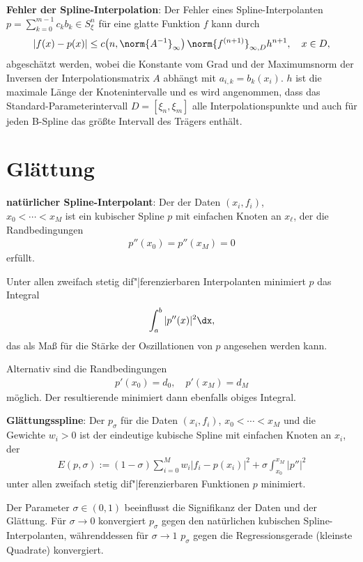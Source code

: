 \linie

\textbf{Fehler der Spline-Interpolation}:
Der Fehler eines Spline-Interpolanten $p = \sum_{k=0}^{m-1} c_k b_k \in S_\xi^n$ für eine glatte
Funktion $f$ kann durch
\begin{align*}
    |f(x) - p(x)| \le c\!\left(n, \norm{A^{-1}}_\infty\right)
    \norm{f^{(n+1)}}_{\infty,D} h^{n+1},\quad
    x \in D,
\end{align*}
abgeschätzt werden, wobei die Konstante vom Grad und der Maximumsnorm der Inversen der
Interpolationsmatrix $A$ abhängt mit $a_{i,k} = b_k(x_i)$.
$h$ ist die maximale Länge der Knotenintervalle und es wird angenommen, dass das
Standard-Parameterintervall $D = [\xi_n, \xi_m]$ alle Interpolationspunkte und auch für jeden
B-Spline das größte Intervall des Trägers enthält.

\pagebreak

\section{%
    Glättung%
}

\textbf{natürlicher Spline-Interpolant}:
Der  der Daten $(x_i, f_i)$,\\
$x_0 < \dotsb < x_M$ ist ein kubischer Spline $p$ mit einfachen Knoten an $x_\ell$,
der die Randbedingungen
\begin{align*}
    p''(x_0) = p''(x_M) = 0
\end{align*}
erfüllt.

Unter allen zweifach stetig dif"|ferenzierbaren Interpolanten minimiert $p$ das Integral
\begin{align*}
    \int_a^b |p''(x)|^2 \dx,
\end{align*}
das als Maß für die Stärke der Oszillationen von $p$ angesehen werden kann.

Alternativ sind die Randbedingungen
\begin{align*}
    p'(x_0) = d_0,\quad
    p'(x_M) = d_M
\end{align*}
möglich.
Der resultierende  minimiert dann ebenfalls obiges
Integral.

\linie

\textbf{Glättungsspline}:
Der  $p_\sigma$ für die Daten $(x_i, f_i)$,
$x_0 < \dotsb < x_M$ und die Gewichte $w_i > 0$ ist der eindeutige kubische Spline mit
einfachen Knoten an $x_i$, der
\begin{align*}
    E(p, \sigma) := (1 - \sigma) \sum_{i=0}^M w_i |f_i - p(x_i)|^2 +
    \sigma \int_{x_0}^{x_M} |p''|^2
\end{align*}
unter allen zweifach stetig dif"|ferenzierbaren Funktionen $p$ minimiert.

Der Parameter $\sigma \in (0, 1)$ beeinflusst die Signifikanz der Daten und der Glättung.
Für $\sigma \to 0$ konvergiert $p_\sigma$ gegen den natürlichen kubischen Spline-Interpolanten,
währenddessen für $\sigma \to 1$ $p_\sigma$ gegen die Regressionsgerade
(kleinste Quadrate) konvergiert.

\pagebreak
